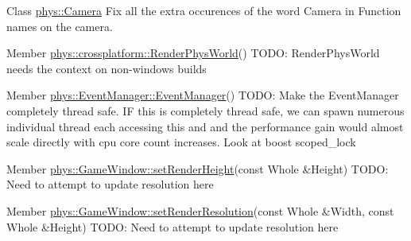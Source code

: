 \begin{DoxyDescription}
\item[Class \hyperlink{classphys_1_1Camera}{phys::Camera} ]Fix all the extra occurences of the word Camera in Function names on the camera. 
\end{DoxyDescription}

\label{todo__todo000007}
\hypertarget{todo__todo000007}{}
 
\begin{DoxyDescription}
\item[Member \hyperlink{namespacephys_1_1crossplatform_a7c0ef3957423db484714c3356603c09d}{phys::crossplatform::RenderPhysWorld}() ]TODO: RenderPhysWorld needs the context on non-\/windows builds 
\end{DoxyDescription}

\label{todo__todo000009}
\hypertarget{todo__todo000009}{}
 
\begin{DoxyDescription}
\item[Member \hyperlink{classphys_1_1EventManager_a018b36588bf2a2e90536e64be060d6fc}{phys::EventManager::EventManager}() ]TODO: Make the EventManager completely thread safe. IF this is completely thread safe, we can spawn numerous individual thread each accessing this and and the performance gain would almost scale directly with cpu core count increases. Look at boost scoped\_\-lock 
\end{DoxyDescription}

\label{todo__todo000010}
\hypertarget{todo__todo000010}{}
 
\begin{DoxyDescription}
\item[Member \hyperlink{classphys_1_1GameWindow_a92e705ba782ff87dacd9ce487141fcab}{phys::GameWindow::setRenderHeight}(const Whole \&Height) ]TODO: Need to attempt to update resolution here 
\end{DoxyDescription}

\label{todo__todo000012}
\hypertarget{todo__todo000012}{}
 
\begin{DoxyDescription}
\item[Member \hyperlink{classphys_1_1GameWindow_a35ecbf1cb77037d33671e0f879f46a30}{phys::GameWindow::setRenderResolution}(const Whole \&Width, const Whole \&Height) ]TODO: Need to attempt to update resolution here 
\end{DoxyDescription}

\label{todo__todo000011}
\hypertarget{todo__todo000011}{}
 
